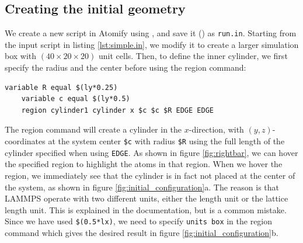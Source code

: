 \documentclass[aps,pre,twocolumn,letterpaper,floatfix,nofootinbib]{revtex4}
\newcommand{\code}[1]{\colorbox{light-gray}{\color{RawSienna}\texttt{#1}}}
\begin{document}
\subsection{Creating the initial geometry}
We create a new script in Atomify using , and save it () as \code{run.in}.
Starting from the input script in listing \ref{lst:simple.in}, we modify it to create a larger simulation box with $(40\times20\times20)$ unit cells.
Then, to define the inner cylinder, we first specify the radius and the center before using the region command:
\begin{lstlisting}[basicstyle=\tiny, frame = none, numbers=none, framexleftmargin=0pt, xleftmargin=-0.75cm, xrightmargin=0.0cm]
	variable R equal $(ly*0.25)
	variable c equal $(ly*0.5)
	region cylinder1 cylinder x $c $c $R EDGE EDGE
\end{lstlisting}
The region command will create a cylinder in the $x$-direction, with $(y,z)$-coordinates at the system center \code{\$c} with radius \code{\$R} using the full length of the cylinder specified when using \code{EDGE}.
As shown in figure \ref{fig:rightbar}, we can hover the specified region to highlight the atoms in that region.
When we hover the region, we immediately see that the cylinder is in fact not placed at the center of the system, as shown in figure \ref{fig:initial_configuration}a.
The reason is that LAMMPS operate with two different units, either the length unit or the lattice length unit. This is explained in the documentation, but is a common mistake.
Since we have used \code{\$(0.5*lx)}, we need to specify \code{units box} in the region command which gives the desired result in figure  \ref{fig:initial_configuration}b.
\end{document}
